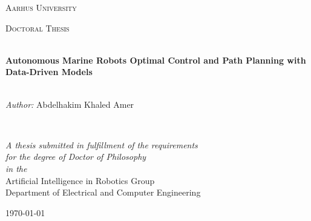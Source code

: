 \documentclass[
10pt, %
b5paper, %
twoside, %
openright  %
]{book}  %
\begin{document}
\begin{titlepage}
\begin{center}

\vspace*{.06\textheight}
{\scshape\LARGE Aarhus University\par}\vspace{1.5cm} %
\textsc{\Large Doctoral Thesis}\\[0.5cm] %

\HRule \\[0.4cm] %
{\huge \bfseries Autonomous Marine Robots Optimal Control and Path Planning with Data-Driven Models
\par}\vspace{0.4cm} %
\HRule \\[1.5cm] %

\emph{Author:}
{Abdelhakim Khaled Amer} %

\begin{minipage}[t]{0.4\textwidth}
\begin{flushright} \large

\end{flushright}
\end{minipage}\\[3cm]
 
\vfill

\large \textit{A thesis submitted in fulfillment of the requirements\\ for the degree of Doctor of Philosophy}\\[0.3cm] %
\textit{in the}\\[0.4cm]
Artificial Intelligence in Robotics Group\\Department of Electrical and Computer Engineering\\[2cm] %
 
\vfill

{\large \today}\\[4cm] %
 
\end{center}
\end{titlepage}
\end{document}
